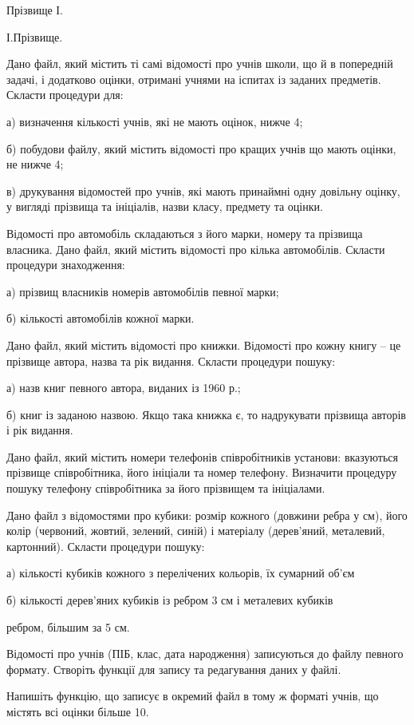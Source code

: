 \documentclass[]{article}
\begin{document}
Прізвище І.

І.Прізвище.

Дано файл, який містить ті самі відомості про учнів школи, що й в
попередній задачі, і додатково оцінки, отримані учнями на іспитах із
заданих предметів. Скласти процедури для:

а) визначення кількості учнів, які не мають оцінок, нижче 4;

б) побудови файлу, який містить відомості про кращих учнів що мають
оцінки, не нижче 4;

в) друкування відомостей про учнів, які мають принаймні одну довільну
оцінку, у вигляді прізвища та ініціалів, назви класу, предмету та
оцінки.

Відомості про автомобіль складаються з його марки, номеру та прізвища
власника. Дано файл, який містить відомості про кілька автомобілів.
Скласти процедури знаходження:

а) прізвищ власників номерів автомобілів певної марки;

б) кількості автомобілів кожної марки.

Дано файл, який містить відомості про книжки. Відомості про кожну книгу
-- це прізвище автора, назва та рік видання. Скласти процедури пошуку:

а) назв книг певного автора, виданих із 1960 р.;

б) книг із заданою назвою. Якщо така книжка є, то надрукувати прізвища
авторів і рік видання.

Дано файл, який містить номери телефонів співробітників установи:
вказуються прізвище співробітника, його ініціали та номер телефону.
Визначити процедуру пошуку телефону співробітника за його прізвищем та
ініціалами.

Дано файл з відомостями про кубики: розмір кожного (довжини ребра у см),
його колір (червоний, жовтий, зелений, синій) і матеріалу (дерев'яний,
металевий, картонний). Скласти процедури пошуку:

а) кількості кубиків кожного з перелічених кольорів, їх сумарний об'єм

б) кількості дерев'яних кубиків із ребром 3 см і металевих кубиків

ребром, більшим за 5 см.

Відомості про учнів (ПІБ, клас, дата народження) записуються до файлу
певного формату. Створіть функції для запису та редагування даних у
файлі.

Напишіть функцію, що записує в окремий файл в тому ж форматі учнів, що
містять всі оцінки більше 10.
\end{document}
